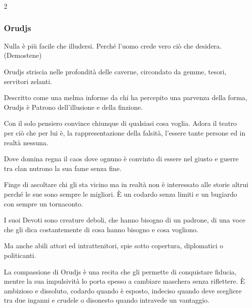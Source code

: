 \begin{multicols}{2}
\subsubsection{Orudjs}\label{orudjs}\hypertarget{orudjs}{}

\begin{enfasi}{
Nulla è più facile che illudersi. Perché l'uomo crede vero ciò che desidera. (Demostene)
}\end{enfasi}

Orudjs striscia nelle profondità delle caverne, circondato da gemme, tesori, servitori zelanti.

Descritto come una melma informe da chi ha percepito una parvenza della forma, Orudjs è Patrono dell'illusione e della finzione.

Con il solo pensiero convince chiunque di qualsiasi cosa voglia. Adora il teatro per ciò che per lui è, la rappresentazione della falsità, l'essere tante persone ed in realtà nessuna.

Dove domina regna il caos dove ognuno è convinto di essere nel giusto e guerre tra clan nutrono la sua fame senza fine.

Finge di ascoltare chi gli sta vicino ma in realtà non è interessato alle storie altrui perché le sue sono sempre le migliori. È un codardo senza limiti e un bugiardo con sempre un tornaconto.

I suoi Devoti sono creature deboli, che hanno bisogno di un padrone, di una voce che gli dica costantemente di cosa hanno bisogno e cosa vogliono.

Ma anche abili attori ed intrattenitori, spie sotto copertura, diplomatici o politicanti.

La compassione di Orudjs è una recita che gli permette di conquistare fiducia, mentre la sua impulsività lo porta spesso a cambiare maschera senza riflettere. È ambizioso e dissoluto, codardo quando è esposto, indeciso quando deve scegliere tra due inganni e crudele o disonesto quando intravede un vantaggio.


\end{multicols}
